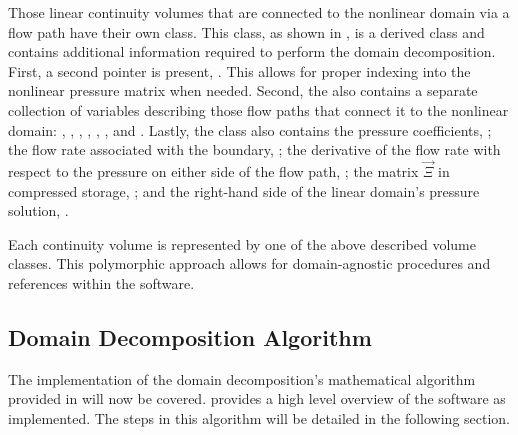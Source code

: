 Those linear continuity volumes that are connected to the nonlinear domain via a flow path have their own  class.
This class, as shown in , is a derived class and contains additional information required to perform the domain decomposition.
First, a second  pointer is present, .
This allows for proper indexing into the nonlinear pressure matrix when needed.
Second, the  also contains a separate collection of variables describing those flow paths that connect it to the nonlinear domain: , , , , , , and .
Lastly, the  class also contains the pressure coefficients, ; the flow rate associated with the boundary, ; the derivative of the flow rate with respect to the pressure on either side of the flow path, ; the matrix $\vec{\Xi}$ in compressed storage, ; and the right-hand side of the linear domain's pressure solution, .

Each continuity volume is represented by one of the above described volume classes.
This polymorphic approach allows for domain-agnostic procedures and references within the software.

\subsection{Domain Decomposition Algorithm}
\label{subsect:domDecompAlgorithm}

The implementation of the domain decomposition's mathematical algorithm provided in  will now be covered.
 provides a high level overview of the software as implemented.
The steps in this algorithm will be detailed in the following section.

